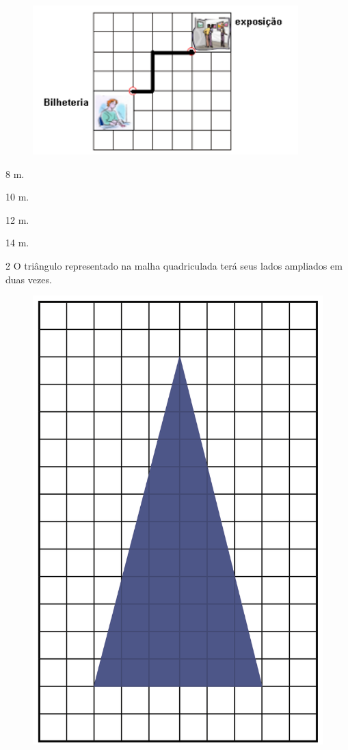 \begin{figure}[htpb!]
\centering
\includegraphics[width=\textwidth]{./imgs/mat8.png}
\end{figure}

\begin{minipage}{.5\textwidth}
\begin{escolha}
\item
  8 m.
\item
  10 m.
\item
  12 m.
\item
  14 m.
\end{escolha}
\end{minipage}

\pagebreak
\num{2} O triângulo representado na malha quadriculada terá seus lados ampliados em duas vezes.

\begin{figure}[htpb!]
\centering
\includegraphics[width=.6\textwidth]{../ilustracoes/MAT5/SAEB_5ANO_MAT_figura47.png}
\end{figure}


